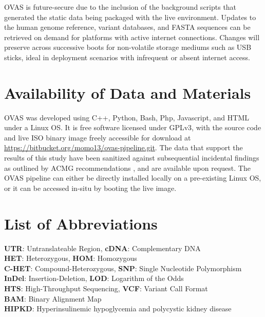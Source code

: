 \documentclass[twocolumn]{bmcart}%
\def\app{OVAS}
\begin{document}
\app{} is future-secure due to the inclusion of the background scripts that generated the static data being packaged with the live environment. Updates to the human genome reference, variant databases, and FASTA sequences can be retrieved on demand for platforms with active internet connections. Changes will preserve across successive boots for non-volatile storage mediums such as USB sticks, ideal in deployment scenarios with infrequent or absent internet access.



\begin{backmatter}

\section*{Availability of Data and Materials}
\app{} was developed using C++, Python, Bash, Php, Javascript, and HTML under a Linux OS. It is free software licensed under GPLv3, with the source code and live ISO binary image freely accessible for download at \url{https://bitbucket.org/momo13/ovas-pipeline.git}. The data that support the results of this study have been sanitized against subsequential incidental findings as outlined by ACMG recommendations \cite{kalia2016recommendations}, and are available upon request. The \app{} pipeline can either be directly installed locally on a pre-existing Linux OS, or it can be accessed in-situ by booting the live image.


\section*{List of Abbreviations}
\textbf{UTR}:  Untranslateable Region, \textbf{cDNA}: Complementary DNA\\
\textbf{HET}: Heterozygous, \textbf{HOM}: Homozygous\\
\textbf{C-HET}: Compound-Heterozygous, \textbf{SNP}: Single Nucleotide Polymorphism\\
\textbf{InDel}: Insertion-Deletion, \textbf{LOD}: Logarithm of the Odds\\
\textbf{HTS}: High-Throughput Sequencing, \textbf{VCF}: Variant Call Format\\
\textbf{BAM}: Binary Alignment Map\\
\textbf{HIPKD}: Hyperinsulinemic hypoglycemia and polycystic kidney disease\\



\end{backmatter}
\end{document}
